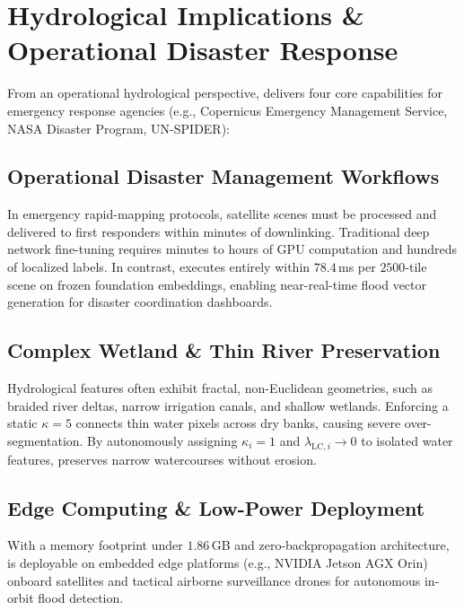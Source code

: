 \section{Hydrological Implications \& Operational Disaster Response}
\label{sec:discussion}
From an operational hydrological perspective, \rllctim{} delivers four core capabilities for emergency response agencies (e.g., Copernicus Emergency Management Service, NASA Disaster Program, UN-SPIDER):

\subsection{Operational Disaster Management Workflows}
In emergency rapid-mapping protocols, satellite scenes must be processed and delivered to first responders within minutes of downlinking. Traditional deep network fine-tuning requires minutes to hours of GPU computation and hundreds of localized labels. In contrast, \rllctim{} executes entirely within $78.4$\,ms per $2500$-tile scene on frozen foundation embeddings, enabling near-real-time flood vector generation for disaster coordination dashboards.

\subsection{Complex Wetland \& Thin River Preservation}
Hydrological features often exhibit fractal, non-Euclidean geometries, such as braided river deltas, narrow irrigation canals, and shallow wetlands. Enforcing a static $\kappa=5$ connects thin water pixels across dry banks, causing severe over-segmentation. By autonomously assigning $\kappa_i=1$ and $\lambda_{\text{LC}, i} \to 0$ to isolated water features, \rllctim{} preserves narrow watercourses without erosion.

\subsection{Edge Computing \& Low-Power Deployment}
With a memory footprint under $1.86$\,GB and zero-backpropagation architecture, \rllctim{} is deployable on embedded edge platforms (e.g., NVIDIA Jetson AGX Orin) onboard satellites and tactical airborne surveillance drones for autonomous in-orbit flood detection.

